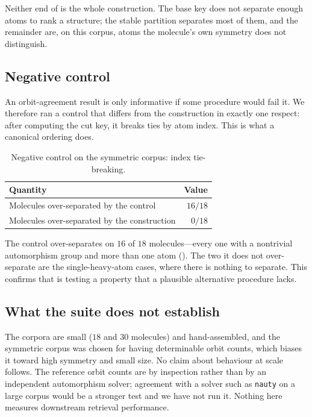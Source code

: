 \documentclass[11pt,twocolumn,a4paper]{article}
\theoremstyle{crthm}
\theoremstyle{definition}
\theoremstyle{remark}
\begin{document}
Neither end of  is the whole construction. The base key
does not separate enough atoms to rank a structure; the stable partition
separates most of them, and the remainder are, on this corpus, atoms the
molecule's own symmetry does not distinguish.


\subsection{Negative control}

An orbit-agreement result is only informative if some procedure would fail
it. We therefore ran a control that differs from the construction in
exactly one respect: after computing the cut key, it breaks ties by atom
index. This is what a canonical ordering does.

\begin{table}[htbp]
\centering\small
\caption{Negative control on the symmetric corpus: index tie-breaking.}
\label{tab:control}
\begin{tabular}{@{}lr@{}}
\toprule
Quantity & Value\\
\midrule
Molecules over-separated by the control & $16/18$\\
Molecules over-separated by the construction & $0/18$\\
\bottomrule
\end{tabular}
\end{table}

The control over-separates on $16$ of $18$ molecules---every one with a
nontrivial automorphism group and more than one atom
(). The two it does not over-separate are the
single-heavy-atom cases, where there is nothing to separate. This confirms
that  is testing a property that a plausible alternative
procedure lacks.

\subsection{What the suite does not establish}

The corpora are small ($18$ and $30$ molecules) and hand-assembled, and
the symmetric corpus was chosen for having determinable orbit counts,
which biases it toward high symmetry and small size. No claim about
behaviour at scale follows. The reference orbit counts are by inspection
rather than by an independent automorphism solver; agreement with a
solver such as \texttt{nauty} \citep{mckay2014} on a large corpus would be
a stronger test and we have not run it. Nothing here measures downstream
retrieval performance.
\end{document}

